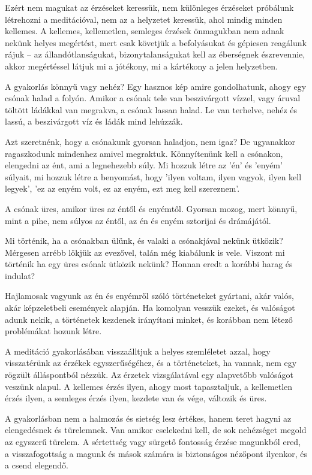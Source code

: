 Ezért nem magukat az érzéseket keressük, nem különleges érzéseket
próbálunk létrehozni a meditációval, nem az a helyzetet keressük, ahol
mindig minden kellemes. A kellemes, kellemetlen, semleges érzések
önmagukban nem adnak nekünk helyes megértést, mert csak követjük a
befolyásukat és gépiesen reagálunk rájuk -- az állandótlanságukat,
bizonytalanságukat kell az éberségnek észrevennie, akkor megértéssel
látjuk mi a jótékony, mi a kártékony a jelen helyzetben.

A gyakorlás könnyű vagy nehéz? Egy hasznos kép amire gondolhatunk, ahogy
egy csónak halad a folyón. Amikor a csónak tele van beszivárgott vízzel,
vagy áruval töltött ládákkal van megrakva, a csónak lassan halad. Le van
terhelve, nehéz és lassú, a beszivárgott víz és ládák mind lehúzzák.

Azt szeretnénk, hogy a csónakunk gyorsan haladjon, nem igaz? De
ugyanakkor ragaszkodunk mindenhez amivel megraktuk. Könnyítenünk kell a
csónakon, elengedni az ént, ami a legnehezebb súly. Mi hozzuk létre az
'én' és 'enyém' súlyait, mi hozzuk létre a benyomást, hogy 'ilyen
voltam, ilyen vagyok, ilyen kell legyek', 'ez az enyém volt, ez az
enyém, ezt meg kell szereznem'.

A csónak üres, amikor üres az éntől és enyémtől. Gyorsan mozog, mert
könnyű, mint a pihe, nem súlyos az éntől, az én és enyém sztorijai és
drámájától.

Mi történik, ha a csónakban ülünk, és valaki a csónakjával nekünk
ütközik? Mérgesen arrébb lökjük az evezővel, talán még kiabálunk is
vele. Viszont mi történik ha egy üres csónak ütközik nekünk? Honnan
eredt a korábbi harag és indulat?

Hajlamosak vagyunk az én és enyémről szóló történeteket gyártani, akár
valós, akár képzeletbeli események alapján. Ha komolyan vesszük ezeket,
és valóságot adunk nekik, a történetek kezdenek irányítani minket, és
korábban nem létező problémákat hozunk létre.

A meditáció gyakorlásában visszaálltjuk a helyes szemléletet azzal, hogy
visszatérünk az érzékek egyszerűségéhez, és a történeteket, ha vannak,
nem egy rögzült álláspontból nézzük. Az érzetek vizsgálatával egy
alapvetőbb valóságot veszünk alapul. A kellemes érzés ilyen, ahogy most
tapasztaljuk, a kellemetlen érzés ilyen, a semleges érzés ilyen, kezdete
van és vége, változik és üres.

A gyakorlásban nem a halmozás és sietség lesz értékes, hanem teret
hagyni az elengedésnek és türelemnek. Van amikor cselekedni kell, de sok
nehézséget megold az egyszerű türelem. A sértettség vagy sürgető
fontosság érzése magunkból ered, a visszafogottság a magunk és mások
számára is biztonságos nézőpont ilyenkor, és a csend elegendő.
